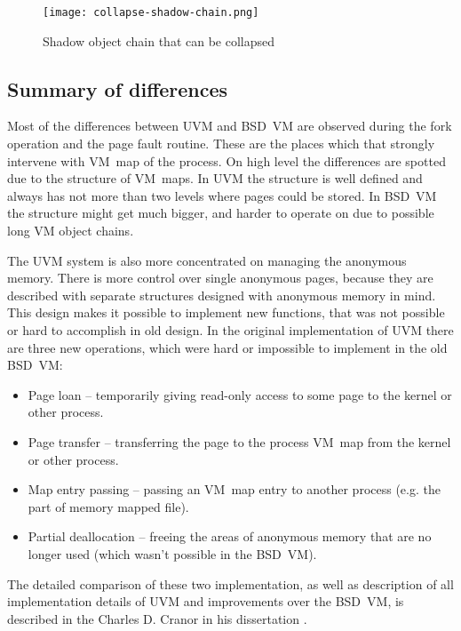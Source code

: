 \begin{figure}
  \centering
  \texttt{[image: collapse-shadow-chain.png]}
  \caption{Shadow object chain that can be collapsed \cite{cranor}}
  \label{img:collapse_shadow_chain}
\end{figure}


\subsection{Summary of differences}

Most of the differences between UVM and BSD~VM are observed during the fork operation and the page fault routine.
These are the places which that strongly intervene with VM~map of the process.
On high level the differences are spotted due to the structure of VM~maps.
In UVM the structure is well defined and always has not more than two levels where pages could be stored.
In BSD~VM the structure might get much bigger, and harder to operate on due to possible long VM object chains.

The UVM system is also more concentrated on managing the anonymous memory.
There is more control over single anonymous pages, because they are described with separate structures designed with anonymous memory in mind.
This design makes it possible to implement new functions, that was not possible or hard to accomplish in old design.
In the original implementation of UVM there are three new operations, which were hard or impossible to implement in the old BSD~VM:

\begin{itemize}
  \item Page loan -- temporarily giving read-only access to some page to the kernel or other process.
  \item Page transfer -- transferring the page to the process VM~map from the kernel or other process.
  \item Map entry passing -- passing an VM~map entry to another process (e.g. the part of memory mapped file).
  \item Partial deallocation -- freeing the areas of anonymous memory that are no longer used (which wasn't possible in the BSD~VM).
\end{itemize}

The detailed comparison of these two implementation, as well as description of all implementation details of UVM and improvements
over the BSD~VM, is described in the Charles D. Cranor in his dissertation \cite{cranor}.

